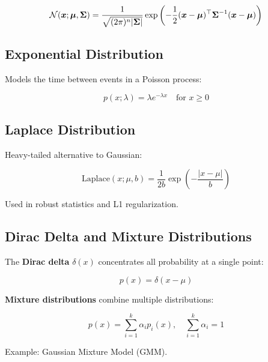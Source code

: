 \begin{equation}
\mathcal{N}(\boldsymbol{x}; \boldsymbol{\mu}, \boldsymbol{\Sigma}) = \frac{1}{\sqrt{(2\pi)^n |\boldsymbol{\Sigma}|}} \exp\left(-\frac{1}{2}(\boldsymbol{x}-\boldsymbol{\mu})^\top \boldsymbol{\Sigma}^{-1} (\boldsymbol{x}-\boldsymbol{\mu})\right)
\end{equation}

\subsection{Exponential Distribution}

Models the time between events in a Poisson process:

\begin{equation}
p(x; \lambda) = \lambda e^{-\lambda x} \quad \text{for } x \geq 0
\end{equation}

\subsection{Laplace Distribution}

Heavy-tailed alternative to Gaussian:

\begin{equation}
\text{Laplace}(x; \mu, b) = \frac{1}{2b} \exp\left(-\frac{|x-\mu|}{b}\right)
\end{equation}

Used in robust statistics and L1 regularization.

\subsection{Dirac Delta and Mixture Distributions}

The \textbf{Dirac delta} $\delta(x)$ concentrates all probability at a single point:

\begin{equation}
p(x) = \delta(x - \mu)
\end{equation}

\textbf{Mixture distributions} combine multiple distributions:

\begin{equation}
p(x) = \sum_{i=1}^{k} \alpha_i p_i(x), \quad \sum_{i=1}^{k} \alpha_i = 1
\end{equation}

Example: Gaussian Mixture Model (GMM).

